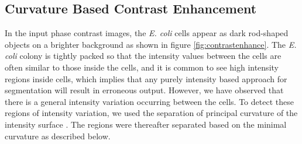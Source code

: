 \documentclass[journal]{IEEEtran}
\begin{document}
\subsection{Curvature Based Contrast Enhancement }
In the input phase contrast images, the \textit{E. coli} cells appear as dark rod-shaped objects on a brighter background as shown in figure \ref{fig:contrastenhance}. The \textit{E. coli} colony is tightly packed so that the intensity values between the cells are often similar to those inside the cells, and it is common to see high intensity regions inside cells, which implies that any purely intensity based approach for segmentation will result in erroneous output. However, we have observed that there is a general intensity variation occurring between the cells. To detect these regions of intensity variation, we used the separation of principal curvature of the intensity surface \cite {willmoreintroduction1959}. The regions were thereafter separated based on the minimal curvature as described below. 
\end{document}
